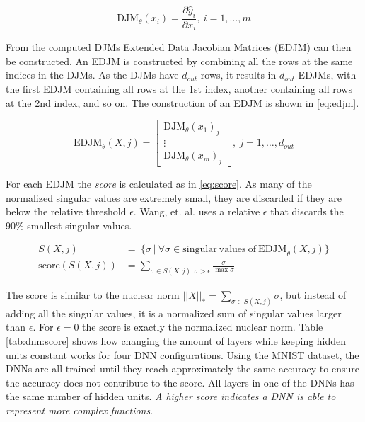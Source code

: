 \begin{equation} \label{eq:wang:djm}
    \mathrm{DJM}_{\theta}(x_i) = \frac{\partial \hat y_i}{\partial x_i},\ i=1, \dots, m
\end{equation}

From the computed DJMs Extended Data Jacobian Matrices (EDJM) can then be constructed. An EDJM is constructed by combining all the rows at the same indices in the DJMs. As the DJMs have $d_{out}$ rows, it results in $d_{out}$ EDJMs, with the first EDJM containing all rows at the 1st index, another containing all rows at the 2nd index, and so on. The construction of an EDJM is shown in \eqref{eq:edjm}.

\begin{equation} \label{eq:edjm}
\mathrm{EDJM}_{\theta}(X, j) =
\begin{bmatrix}
\mathrm{DJM}_{\theta}(x_1)_j \\
\vdots \\
\mathrm{DJM}_{\theta}(x_m)_j
\end{bmatrix},\ j=1,\dots,d_{out}
\end{equation}

For each EDJM the \textit{score} is calculated as in \eqref{eq:score}. As many of the normalized singular values are extremely small, they are discarded if they are below the relative threshold $\epsilon$. Wang, et. al. uses a relative $\epsilon$ that discards the 90\% smallest singular values.

\begin{equation} \label{eq:score}
  \begin{split}
  S(X, j) &=\ \{\sigma\ |\ \forall \sigma \in \mathrm{singular\ values\ of\ EDJM}_{\theta}(X, j) \} \\  
  \mathrm{score}(S(X, j)) &=  \sum_{\sigma \in S(X, j), \sigma > \epsilon} \frac{\sigma}{\max{\sigma}}  
  \end{split}
\end{equation}

The score is similar to the nuclear norm $||X||_* = \sum_{\sigma \in S(X, j)} \sigma$, but instead of adding all the singular values, it is a normalized sum of singular values larger than $\epsilon$. For $\epsilon=0$ the score is exactly the normalized nuclear norm. Table \ref{tab:dnn:score} shows how changing the amount of layers while keeping hidden units constant works for four DNN configurations. Using the MNIST dataset, the DNNs are all trained until they reach approximately the same accuracy to ensure the accuracy does not contribute to the score. All layers in one of the DNNs has the same number of hidden units. \textit{A higher score indicates a DNN is able to represent more complex functions}.

